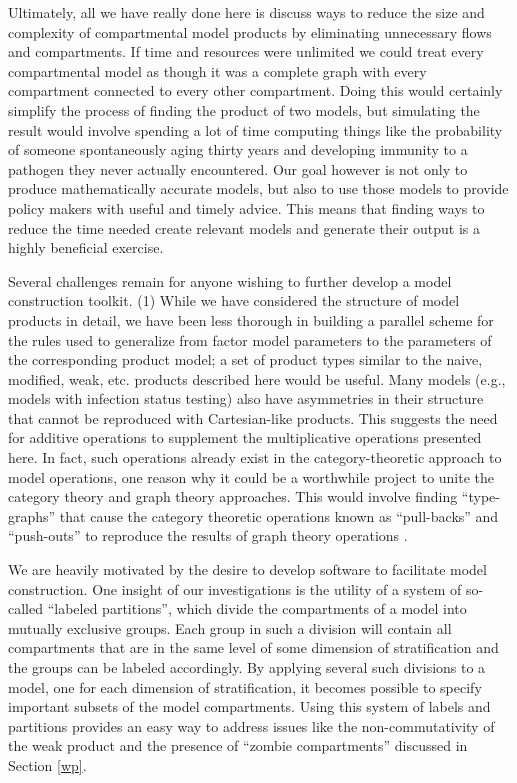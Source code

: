 Ultimately, all we have really done here is discuss ways to reduce the size and complexity of compartmental model products by eliminating unnecessary flows and compartments. If time and resources were unlimited we could treat every compartmental model as though it was a complete graph with every compartment connected to every other compartment. Doing this would certainly simplify the process of finding the product of two models, but simulating the result would involve spending a lot of time computing things like the probability of someone spontaneously aging thirty years and developing immunity to a pathogen they never actually encountered. Our goal however is not only to produce mathematically accurate models, but also to use those models to provide policy makers with useful and timely advice. This means that finding ways to reduce the time needed create relevant models and generate their output is a highly beneficial exercise.

Several challenges remain for anyone wishing to further develop a model construction toolkit. (1) While we have considered the structure of model products in detail, we have been less thorough in building a parallel scheme for the rules used to generalize from factor model parameters to the parameters of the corresponding product model; a set of product types similar to the naive, modified, weak, etc. products described here would be useful. Many models (e.g., models with infection status testing) also have asymmetries in their structure that cannot be reproduced with Cartesian-like products. This suggests the need for additive operations to supplement the multiplicative operations presented here. In fact, such operations already exist in the category-theoretic approach to model operations, one reason why it could be a worthwhile project to unite the category theory and graph theory approaches. This would involve finding ``type-graphs'' that cause the category theoretic operations known as ``pull-backs'' and ``push-outs'' to  reproduce the results of graph theory operations \citep{fong2018seven, Libkind2022an, libkind2021operadic, baez2023categorical, baez2017compositional}.

We are heavily motivated by the desire to develop software to facilitate model construction. One insight of our investigations is the utility of a system of so-called ``labeled partitions'', which divide the compartments of a model into mutually exclusive groups. Each group in such a division will contain all compartments that are in the same level of some dimension of stratification and the groups can be labeled accordingly. By applying several such divisions to a model, one for each dimension of stratification, it becomes possible to specify important subsets of the model compartments. Using this system of labels and partitions provides an easy way to address issues like the non-commutativity of the weak product and the presence of ``zombie compartments'' discussed in Section \ref{wp}.

